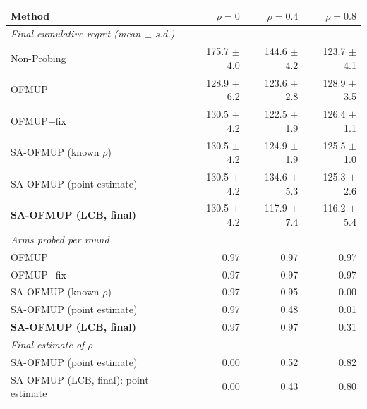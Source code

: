 \begin{tabular}{lrrr}
\toprule
Method & $\rho=0$ & $\rho=0.4$ & $\rho=0.8$ \\
\midrule
\multicolumn{4}{l}{\emph{Final cumulative regret (mean $\pm$ s.d.)}} \\
Non-Probing & 175.7 $\pm$ 4.0 & 144.6 $\pm$ 4.2 & 123.7 $\pm$ 4.1 \\
OFMUP & 128.9 $\pm$ 6.2 & 123.6 $\pm$ 2.8 & 128.9 $\pm$ 3.5 \\
OFMUP+fix & 130.5 $\pm$ 4.2 & 122.5 $\pm$ 1.9 & 126.4 $\pm$ 1.1 \\
SA-OFMUP (known $\rho$) & 130.5 $\pm$ 4.2 & 124.9 $\pm$ 1.9 & 125.5 $\pm$ 1.0 \\
SA-OFMUP (point estimate) & 130.5 $\pm$ 4.2 & 134.6 $\pm$ 5.3 & 125.3 $\pm$ 2.6 \\
\textbf{SA-OFMUP (LCB, final)} & 130.5 $\pm$ 4.2 & 117.9 $\pm$ 7.4 & 116.2 $\pm$ 5.4 \\
\midrule
\multicolumn{4}{l}{\emph{Arms probed per round}} \\
OFMUP & 0.97 & 0.97 & 0.97 \\
OFMUP+fix & 0.97 & 0.97 & 0.97 \\
SA-OFMUP (known $\rho$) & 0.97 & 0.95 & 0.00 \\
SA-OFMUP (point estimate) & 0.97 & 0.48 & 0.01 \\
\textbf{SA-OFMUP (LCB, final)} & 0.97 & 0.97 & 0.31 \\
\midrule
\multicolumn{4}{l}{\emph{Final estimate of $\rho$}} \\
SA-OFMUP (point estimate) & 0.00 & 0.52 & 0.82 \\
SA-OFMUP (LCB, final): point estimate & 0.00 & 0.43 & 0.80 \\
\bottomrule
\end{tabular}

